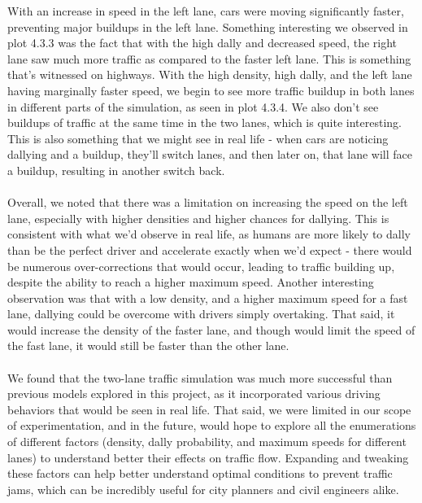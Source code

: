\documentclass{article}
\begin{document}
With an increase in speed in the left lane, cars were moving significantly faster, preventing major buildups in the left lane. Something interesting we observed in plot 4.3.3 was the fact that with the high dally and decreased speed, the right lane saw much more traffic as compared to the faster left lane. This is something that's witnessed on highways. With the high density, high dally, and the left lane having marginally faster speed, we begin to see more traffic buildup in both lanes in different parts of the simulation, as seen in plot 4.3.4. We also don't see buildups of traffic at the same time in the two lanes, which is quite interesting. This is also something that we might see in real life - when cars are noticing dallying and a buildup, they'll switch lanes, and then later on, that lane will face a buildup, resulting in another switch back. \\\\
Overall, we noted that there was a limitation on increasing the speed on the left lane, especially with higher densities and higher chances for dallying. This is consistent with what we'd observe in real life, as humans are more likely to dally than be the perfect driver and accelerate exactly when we'd expect - there would be numerous over-corrections that would occur, leading to traffic building up, despite the ability to reach a higher maximum speed. Another interesting observation was that with a low density, and a higher maximum speed for a fast lane, dallying could be overcome with drivers simply overtaking. That said, it would increase the density of the faster lane, and though would limit the speed of the fast lane, it would still be faster than the other lane. \\\\
We found that the two-lane traffic simulation was much more successful than previous models explored in this project, as it incorporated various driving behaviors that would be seen in real life. That said, we were limited in our scope of experimentation, and in the future, would hope to explore all the enumerations of different factors (density, dally probability, and maximum speeds for different lanes) to understand better their effects on traffic flow. Expanding and tweaking these factors can help better understand optimal conditions to prevent traffic jams, which can be incredibly useful for city planners and civil engineers alike. 
\end{document}
